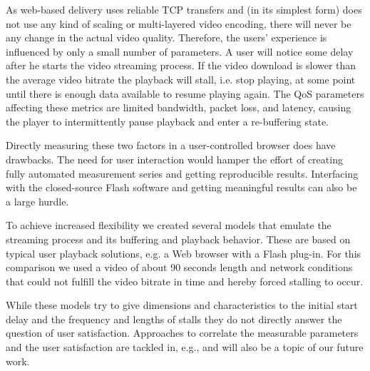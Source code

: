 As web-based delivery uses reliable TCP transfers and (in its simplest form) does not use any kind of scaling or multi-layered video encoding, there will never be any change in the actual video quality. Therefore, the users' experience is influenced by only a small number of parameters. A user will notice some delay after he starts the video streaming process. If the video download is slower than the average video bitrate the playback will stall, i.e. stop playing, at some point until there is enough data available to resume playing again.
The QoS parameters affecting these metrics are limited bandwidth, packet loss, and latency, causing the player to intermittently pause playback and enter a re-buffering state.

Directly measuring these two factors in a user-controlled browser does have drawbacks. The need for user interaction would hamper the effort of creating fully automated measurement series and getting reproducible results. Interfacing with the closed-source Flash software and getting meaningful results can also be a large hurdle.

To achieve increased flexibility we created several models that emulate the streaming process and its buffering and playback behavior. These are based on typical user playback solutions, e.g. a Web browser with a Flash plug-in. For this comparison we used a video of about 90 seconds length and network conditions that could not fulfill the video bitrate in time and hereby forced stalling to occur.

While these models try to give dimensions and characteristics to the initial start delay and the frequency and lengths of stalls they do not directly answer the question of user satisfaction. Approaches to correlate the  measurable parameters and the user satisfaction are tackled in, e.g., \cite{ketyko2010qoe, mokmeasuring, gustafsson2008measuring} and will also be a topic of our future work.


